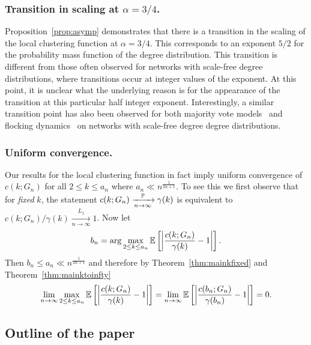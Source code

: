 \subsubsection{Transition in scaling at $\alpha = 3/4$.}


Proposition~\ref{prop:asymp} demonstrates that there is a transition in the scaling of the local clustering 
function at $\alpha = 3/4$. 
This corresponds to an exponent $5/2$ for the probability mass function of the degree distribution. 
This transition is different from those often observed for networks with scale-free degree distributions, where transitions occur at
integer values of the exponent. 
At this point, it is unclear what the underlying reason is for the appearance of the transition at this particular half integer 
exponent. 
Interestingly, a similar transition point has also been observed for both majority vote models~\cite{chen2015critical} and 
flocking dynamics~\cite{miguel2018effects} on networks with scale-free degree degree distributions.


\subsubsection{Uniform convergence.}

Our results for the local clustering function in fact imply uniform convergence of $c(k; G_n)$ for all $2 \le k \le a_n$ 
where $a_n \ll n^{\frac{1}{2\alpha + 1}}$. 
To see this we first observe that for {\em fixed} $k$, the statement $c(k;G_n) \xrightarrow[n\to\infty]{\mathbb{P}} \gamma(k)$
is equivalent to $c(k;G_n)/\gamma(k) \xrightarrow[n\to\infty]{L_1} 1$.
Now let
\[
	b_n = \arg \max_{2 \le k \le a_n} \mathbb{E}\left[\left|\frac{c(k; G_n)}{\gamma(k)} - 1\right|\right].
\]
Then $b_n \le a_n \ll n^{\frac{1}{2\alpha + 1}}$ and therefore by Theorem~\ref{thm:mainkfixed} and Theorem~\ref{thm:mainktoinfty}
\[
	\lim_{n \to \infty} \max_{2 \le k \le a_n} \mathbb{E}\left[\left|\frac{c(k; G_n)}{\gamma(k)} - 1\right|\right] 
	= \lim_{n \to \infty}\mathbb{E}\left[\left|\frac{c(b_n; G_n)}{\gamma(b_n)} - 1\right|\right] = 0.
\]



\subsection{Outline of the paper}


